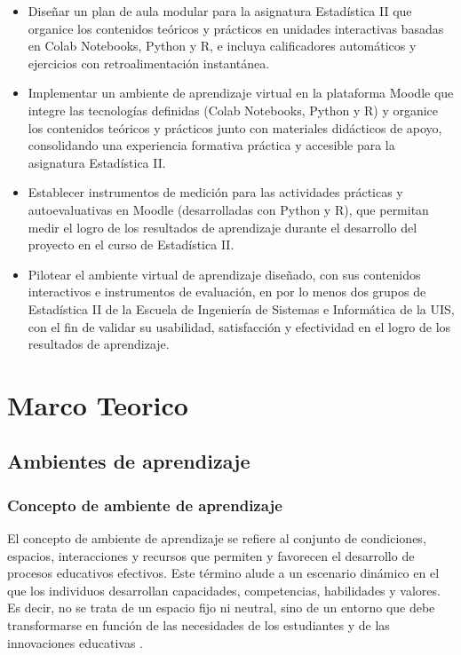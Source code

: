 \documentclass[letter,oneside,12pt,spanish]{report}
\begin{document}
\begin{itemize}
    \item Diseñar un plan de aula modular para la asignatura Estadística II que organice los contenidos teóricos y prácticos en unidades interactivas basadas en Colab Notebooks, Python y R, e incluya calificadores automáticos y ejercicios con retroalimentación instantánea.
    
    \item Implementar un ambiente de aprendizaje virtual en la plataforma Moodle que integre las tecnologías definidas (Colab Notebooks, Python y R) y organice los contenidos teóricos y prácticos junto con materiales didácticos de apoyo, consolidando una experiencia formativa práctica y accesible para la asignatura Estadística II.
    
    \item Establecer instrumentos de medición para las actividades prácticas y autoevaluativas en Moodle (desarrolladas con Python y R), que permitan medir el logro de los resultados de aprendizaje durante el desarrollo del proyecto en el curso de Estadística II.

    \item Pilotear el ambiente virtual de aprendizaje diseñado, con sus contenidos interactivos e instrumentos de evaluación, en por lo menos dos grupos de Estadística II de la Escuela de Ingeniería de Sistemas e Informática de la UIS, con el fin de validar su usabilidad, satisfacción y efectividad en el logro de los resultados de aprendizaje.

\end{itemize}


\newpage

\chapter{Marco Teorico}

\section{Ambientes de aprendizaje}

\subsection{Concepto de ambiente de aprendizaje}

El concepto de ambiente de aprendizaje se refiere al conjunto de condiciones, espacios, interacciones y recursos que permiten y favorecen el desarrollo de procesos educativos efectivos. Este término alude a un escenario dinámico en el que los individuos desarrollan capacidades, competencias, habilidades y valores. Es decir, no se trata de un espacio fijo ni neutral, sino de un entorno que debe transformarse en función de las necesidades de los estudiantes y de las innovaciones educativas \parencite{castro2019}.
\end{document}
